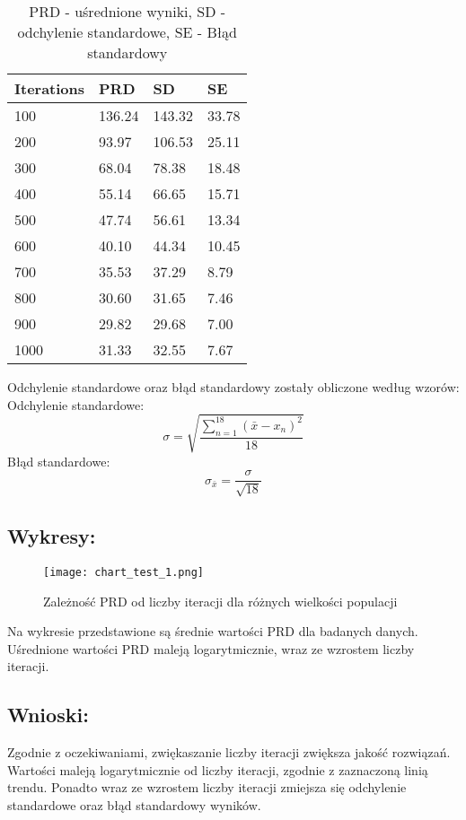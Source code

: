   \begin{table}[!ht]
    \centering
    \begin{tabular}{|l|l|l|l|}
    \hline
        Iterations & PRD & SD & SE \\ \hline
        100 & 136.24 & 143.32 & 33.78 \\ \hline
        200 & 93.97 & 106.53 & 25.11 \\ \hline
        300 & 68.04 & 78.38 & 18.48 \\ \hline
        400 & 55.14 & 66.65 & 15.71 \\ \hline
        500 & 47.74 & 56.61 & 13.34 \\ \hline
        600 & 40.10 & 44.34 & 10.45 \\ \hline
        700 & 35.53 & 37.29 & 8.79 \\ \hline
        800 & 30.60 & 31.65 & 7.46 \\ \hline
        900 & 29.82 & 29.68 & 7.00 \\ \hline
        1000 & 31.33 & 32.55 & 7.67 \\ \hline
    \end{tabular}
    \caption{PRD - uśrednione wyniki, SD - odchylenie standardowe, SE - Błąd standardowy}
  \end{table}

  Odchylenie standardowe oraz błąd standardowy zostały obliczone według wzorów: \\
    Odchylenie standardowe:
    \[ \sigma = \sqrt{\frac{\sum_{n = 1}^{18}(\bar{x} - x_n)^2}{18}} \]
    Błąd standardowe:
    \[ \sigma_{\bar{x}} = \frac{\sigma}{\sqrt{18}} \]

  \subsection{Wykresy: }
    \begin{figure}[H]
      \texttt{[image: chart\_test\_1.png]}
      \centering
      \caption{Zależność PRD od liczby iteracji dla różnych wielkości populacji}
    \end{figure}
  
  Na wykresie przedstawione są średnie wartości PRD dla badanych danych. Uśrednione wartości PRD maleją logarytmicznie, wraz ze wzrostem liczby iteracji.

  \subsection{Wnioski: }
  Zgodnie z oczekiwaniami, zwiękaszanie liczby iteracji zwiększa jakość rozwiązań. Wartości maleją logarytmicznie od liczby iteracji, zgodnie z zaznaczoną linią trendu. Ponadto wraz ze wzrostem liczby iteracji zmiejsza się odchylenie standardowe oraz błąd standardowy wyników.

